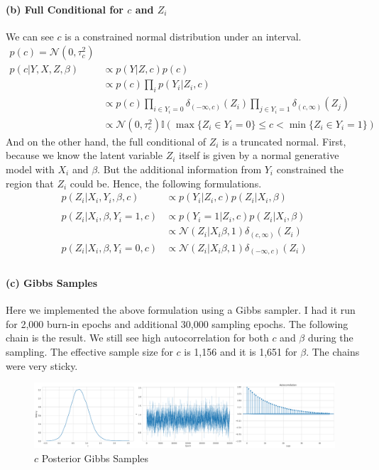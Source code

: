 \documentclass[11pt, letterpaper]{article}
\begin{document}
\paragraph{(b) Full Conditional for $c$ and $Z_i$}
We can see $c$ is a constrained normal distribution under an interval.
\begin{align*}
    p(c) = \mathcal{N}(0, \tau_c^2) \\
    p(c|Y, X, Z, \beta) &\propto p(Y|Z, c) p(c) \\
        &\propto p(c) \prod_i p(Y_i|Z_i, c) \\
        &\propto p(c) \prod_{i \in Y_i=0} \delta_{(-\infty,c)}(Z_i) \prod_{j \in Y_i=1} \delta_{(c,\infty)}(Z_j) \\
        &\propto \mathcal{N}(0, \tau_c^2) \mathbb{I}(\max\{Z_i \in Y_i=0\} \leq c < \min\{Z_i \in Y_i=1\}) 
\end{align*}
And on the other hand, the full conditional of $Z_i$ is a truncated normal. First, because we know the latent variable $Z_i$ itself is given by a normal generative model with $X_i$ and $\beta$. But the additional information from $Y_i$ constrained the region that $Z_i$ could be. Hence, the following formulations.
\begin{align*}
    p(Z_i|X_i,Y_i,\beta,c) &\propto p(Y_i|Z_i, c) p(Z_i|X_i, \beta) \\ \\
    p(Z_i|X_i,\beta,Y_i=1,c) &\propto p(Y_i=1|Z_i, c) p(Z_i|X_i, \beta) \\
        &\propto \mathcal{N}(Z_i|X_i\beta, 1)\delta_{(c,\infty)}(Z_i) \\
    p(Z_i|X_i,\beta,Y_i=0,c) &\propto \mathcal{N}(Z_i|X_i\beta, 1)\delta_{(-\infty,c)}(Z_i) \\
\end{align*}

\paragraph{(c) Gibbs Samples}
Here we implemented the above formulation using a Gibbs sampler. I had it run for 2,000 burn-in epochs and additional 30,000 sampling epochs. The following chain is the result. We still see high autocorrelation for both $c$ and $\beta$ during the sampling. The effective sample size for $c$ is 1,156 and it is 1,651 for $\beta$. The chains were very sticky.
\begin{figure}[!h]
  \centering
  \includegraphics[width=1.0\textwidth]{6.3.3(1).png}
  \captionsetup{justification=centering}
  \caption{$c$ Posterior Gibbs Samples}
\end{figure}
\end{document}
